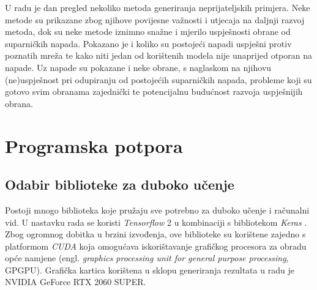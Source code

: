 \documentclass[utf8, diplomski]{fer}
\begin{document}
U radu je dan pregled nekoliko metoda generiranja neprijateljskih primjera. Neke metode su prikazane zbog njihove povijesne važnosti i utjecaja na daljnji razvoj metoda, dok su neke metode iznimno snažne i mjerilo uspješnosti obrane od suparničkih napada. Pokazano je i koliko su postojeći napadi uspješni protiv poznatih mreža te kako niti jedan od korištenih modela nije unaprijed otporan na napade. Uz napade su pokazane i neke obrane, s naglaskom na njihovu (ne)uspješnost pri odupiranju od postojećih suparničkih napada, probleme koji su gotovo svim obranama zajednički te potencijalnu budućnost razvoja uspješnijih obrana.


\chapter{Programska potpora}
\section{Odabir biblioteke za duboko učenje}
Postoji mnogo biblioteka koje pružaju sve potrebno za duboko učenje i računalni vid. U nastavku rada se koristi \textit{Tensorflow} 2 \citep{abadi2016tensorflow} u kombinaciji s bibliotekom \textit{Keras} \citep{chollet2015keras}. Zbog ogromnog dobitka u brzini izvođenja, ove biblioteke su korištene zajedno s platformom \textit{CUDA} koja omogućava iskorištavanje grafičkog procesora za obradu opće namjene (engl. \textit{graphics processing unit for general purpose processing}, GPGPU). Grafička kartica korištena u sklopu generiranja rezultata u radu je NVIDIA GeForce RTX 2060 SUPER.
\end{document}
